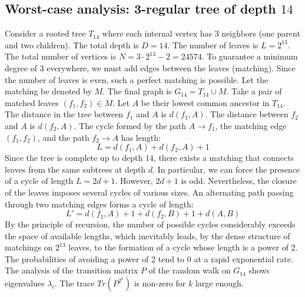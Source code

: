 \documentclass[11pt,a4paper]{article}
\begin{document}
\subsection{Worst-case analysis: 3-regular tree of depth $14$}
Consider a rooted tree $T_{14}$ where each internal vertex has 3 neighbors (one parent and two children).
The total depth is $D = 14$.
The number of leaves is $L = 2^{13}$.
The total number of vertices is $N = 3 \cdot 2^{13} - 2 = 24574$.
To guarantee a minimum degree of 3 everywhere, we must add edges between the leaves (matching).
Since the number of leaves is even, such a perfect matching is possible.
Let the matching be denoted by $M$. The final graph is $G_{14} = T_{14} \cup M$.
Take a pair of matched leaves $(f_1, f_2) \in M$.
Let $A$ be their lowest common ancestor in $T_{14}$.
The distance in the tree between $f_1$ and $A$ is $d(f_1, A)$.
The distance between $f_2$ and $A$ is $d(f_2, A)$.
The cycle formed by the path $A \to f_1$, the matching edge $(f_1, f_2)$, and the path $f_2 \to A$ has length:
$$ L = d(f_1, A) + d(f_2, A) + 1 $$
Since the tree is complete up to depth $14$, there exists a matching that connects leaves from the same subtrees at depth $d$.
In particular, we can force the presence of a cycle of length $L = 2d + 1$. However, $2d+1$ is odd.
Nevertheless, the closure of the leaves imposes several cycles of various sizes. An alternating path passing through two matching edges forms a cycle of length:
$$ L' = d(f_1, A) + 1 + d(f_2, B) + 1 + d(A, B) $$
By the principle of recursion, the number of possible cycles considerably exceeds the space of available lengths, which inevitably leads, by the dense structure of matchings on $2^{13}$ leaves, to the formation of a cycle whose length is a power of 2. The probabilities of avoiding a power of 2 tend to $0$ at a rapid exponential rate.
The analysis of the transition matrix $P$ of the random walk on $G_{14}$ shows eigenvalues $\lambda_i$. The trace $Tr(P^{2^k})$ is non-zero for $k$ large enough.
\end{document}
